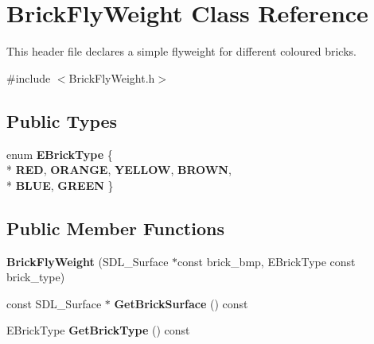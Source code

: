 \hypertarget{class_brick_fly_weight}{}\section{Brick\+Fly\+Weight Class Reference}
\label{class_brick_fly_weight}


This header file declares a simple flyweight for different coloured bricks.  




{\ttfamily \#include $<$Brick\+Fly\+Weight.\+h$>$}

\subsection*{Public Types}
\begin{DoxyCompactItemize}
\item 
\hypertarget{class_brick_fly_weight_af4fde2a530a03e1ed036791793ceb4f0}{}enum {\bfseries E\+Brick\+Type} \{ \\*
{\bfseries R\+E\+D}, 
{\bfseries O\+R\+A\+N\+G\+E}, 
{\bfseries Y\+E\+L\+L\+O\+W}, 
{\bfseries B\+R\+O\+W\+N}, 
\\*
{\bfseries B\+L\+U\+E}, 
{\bfseries G\+R\+E\+E\+N}
 \}\label{class_brick_fly_weight_af4fde2a530a03e1ed036791793ceb4f0}

\end{DoxyCompactItemize}
\subsection*{Public Member Functions}
\begin{DoxyCompactItemize}
\item 
\hypertarget{class_brick_fly_weight_a7c287926919f47b3d554428d15c1fa25}{}{\bfseries Brick\+Fly\+Weight} (S\+D\+L\+\_\+\+Surface $\ast$const brick\+\_\+bmp, E\+Brick\+Type const brick\+\_\+type)\label{class_brick_fly_weight_a7c287926919f47b3d554428d15c1fa25}

\item 
\hypertarget{class_brick_fly_weight_ae8727465822b43dcecbff00538d9617a}{}const S\+D\+L\+\_\+\+Surface $\ast$ {\bfseries Get\+Brick\+Surface} () const \label{class_brick_fly_weight_ae8727465822b43dcecbff00538d9617a}

\item 
\hypertarget{class_brick_fly_weight_adf9c46301edbc8e78193fadc7f93895b}{}E\+Brick\+Type {\bfseries Get\+Brick\+Type} () const \label{class_brick_fly_weight_adf9c46301edbc8e78193fadc7f93895b}

\end{DoxyCompactItemize}


